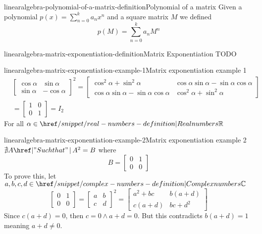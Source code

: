 \documentclass[preview]{standalone}
\begin{document}
\begin{snippetdefinition}{linearalgebra-polynomial-of-a-matrix-definition}{Polynomial of a matrix}
    Given a polynomial \(p(x)=\sum_{n=0}^k a_nx^n\)
    and a square matrix \(M\) we defined
    \[
        p(M) = \sum_{n=0}^k a_nM^n
    \]
\end{snippetdefinition}

\begin{snippetdefinition}{linearalgebra-matrix-exponentiation-definition}{Matrix Exponentiation}
    TODO
\end{snippetdefinition}

\begin{snippetexample}{linearalgebra-matrix-exponentiation-example-1}{Matrix exponentiation example 1}
    \begin{align*}
        & {\begin{bmatrix}
            \cos\alpha & \sin\alpha \\
            \sin\alpha & -\cos\alpha
        \end{bmatrix}}^2
        = \begin{bmatrix}
            \cos^2\alpha + \sin^2\alpha & \cos\alpha\sin\alpha - \sin\alpha\cos\alpha \\
            \cos\alpha\sin\alpha - \sin\alpha\cos\alpha & \cos^2\alpha + \sin^2\alpha
        \end{bmatrix}
        \\
        &= \begin{bmatrix}
            1 & 0 \\
            0 & 1
        \end{bmatrix} = I_2
    \end{align*}
    For all \(\alpha \in \realnumbers\)
\end{snippetexample}

\begin{snippetexample}{linearalgebra-matrix-exponentiation-example-2}{Matrix exponentiation example 2}
    \(\nexists A \suchthat A^2 = B\) where
    \[
        B = \begin{bmatrix}
            0 & 1 \\
            0 & 0
        \end{bmatrix}
    \]
    To prove this, let \(a,b,c,d \in \complexnumbers\)
    \[
        \begin{bmatrix}
            0 & 1 \\
            0 & 0
        \end{bmatrix}
        =
        {\begin{bmatrix}
            a & b \\
            c & d
        \end{bmatrix}}^2
        =
        \begin{bmatrix}
            a^2+bc & b(a+d) \\
            c(a+d) & bc+d^2
        \end{bmatrix}
    \]
    Since \(c(a+d)=0\), then \(c=0 \land a+d=0\).
    But this contradicts \(b(a+d)=1\) meaning \(a+d \neq 0\).
\end{snippetexample}
\end{document}
